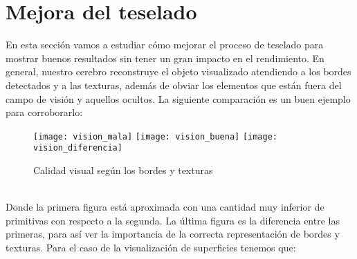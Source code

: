 \section{Mejora del teselado}
	En esta sección vamos a estudiar cómo mejorar el proceso de teselado para mostrar buenos resultados sin tener un gran impacto en el rendimiento. En general, nuestro cerebro reconstruye el objeto visualizado atendiendo a los bordes detectados y a las texturas, además de obviar los elementos que están fuera del campo de visión y aquellos ocultos. La siguiente comparación es un buen ejemplo para corroborarlo:\\
	\begin{figure}[h]
  		\centering
  		\texttt{[image: vision\_mala]}
  		\texttt{[image: vision\_buena]}
  		\texttt{[image: vision\_diferencia]}
  		\caption{Calidad visual según los bordes y texturas}
  		\label{fig:vision_humana}
	\end{figure}
	\\Donde la primera figura está aproximada con una cantidad muy inferior de primitivas con respecto a la segunda. La última figura es la diferencia entre las primeras, para así ver la importancia de la correcta representación de bordes y texturas. Para el caso de la visualización de superficies tenemos que:

